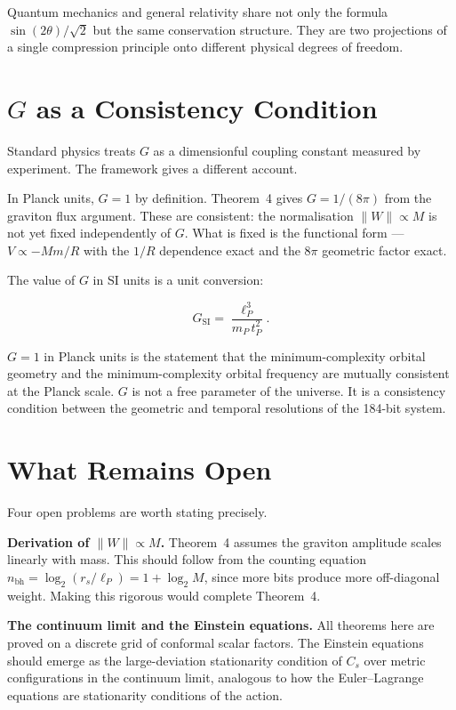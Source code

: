 Quantum mechanics and general relativity share not only the formula
$\sin(2\theta)/\sqrt{2}$ but the same conservation structure. They
are two projections of a single compression principle onto different
physical degrees of freedom.

\section{$G$ as a Consistency Condition}

Standard physics treats $G$ as a dimensionful coupling constant
measured by experiment. The framework gives a different account.

In Planck units, $G = 1$ by definition. Theorem~4 gives $G = 1/(8\pi)$
from the graviton flux argument. These are consistent: the
normalisation $\|W\| \propto M$ is not yet fixed independently of $G$.
What is fixed is the functional form --- $V \propto -Mm/R$ with the
$1/R$ dependence exact and the $8\pi$ geometric factor exact.

The value of $G$ in SI units is a unit conversion:

\[
G_{\mathrm{SI}} = \frac{\ell_P^3}{m_P\,t_P^2}.
\]

$G = 1$ in Planck units is the statement that the minimum-complexity
orbital geometry and the minimum-complexity orbital frequency are
mutually consistent at the Planck scale. $G$ is not a free parameter
of the universe. It is a consistency condition between the geometric
and temporal resolutions of the 184-bit system.

\section{What Remains Open}

Four open problems are worth stating precisely.

\textbf{Derivation of $\|W\| \propto M$.} Theorem~4 assumes the
graviton amplitude scales linearly with mass. This should follow from
the counting equation $n_{\mathrm{bh}} = \log_2(r_s/\ell_P) = 1 +
\log_2 M$, since more bits produce more off-diagonal weight. Making
this rigorous would complete Theorem~4.

\textbf{The continuum limit and the Einstein equations.} All theorems
here are proved on a discrete grid of conformal scalar factors. The
Einstein equations should emerge as the large-deviation stationarity
condition of $C_s$ over metric configurations in the continuum limit,
analogous to how the Euler--Lagrange equations are stationarity
conditions of the action.

